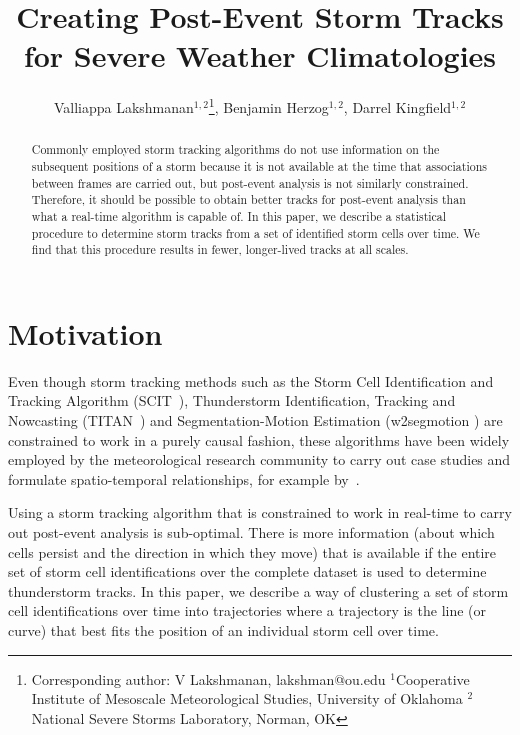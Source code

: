 \documentclass[11pt,twocolumn,twoside]{IEEEtran}
\begin{document}
\title{\vspace{0.2in}\sc Creating Post-Event Storm Tracks for Severe Weather Climatologies}
\author{Valliappa Lakshmanan$^{1,2}$\thanks{Corresponding author: V Lakshmanan, lakshman@ou.edu $^1$Cooperative Institute of Mesoscale Meteorological Studies, University of Oklahoma $^2$National Severe Storms Laboratory, Norman, OK}, Benjamin Herzog$^{1,2}$, Darrel Kingfield$^{1,2}$}

\maketitle
\thispagestyle{fancy}
\begin{abstract}
Commonly employed storm tracking algorithms do not use information on the
subsequent positions of a storm because it is not available at
the time that associations between frames are carried out,
but post-event analysis is
not similarly constrained. Therefore, it should be possible to
obtain better tracks for post-event analysis than what a real-time
algorithm is capable of. In this paper, we describe a statistical
procedure to determine storm tracks from a set of identified storm cells
over time. We find that this procedure results in fewer, longer-lived tracks
at all scales.
\end{abstract}

\section{Motivation}
Even though storm tracking methods such as the Storm Cell Identification
and Tracking Algorithm (SCIT~\cite{scit}), Thunderstorm Identification,
Tracking and Nowcasting (TITAN~\cite{titan}) and Segmentation-Motion
Estimation (w2segmotion \cite{atmosresearch,stormattr}) are constrained
to work in a purely causal fashion, these algorithms have been widely
employed by the meteorological research community to carry out case
studies and formulate spatio-temporal relationships, for example by~\cite{scituse1,scituse3,segmotionuse1,titanuse1}.

Using a storm tracking algorithm that is constrained to work in real-time
to carry out post-event analysis is sub-optimal. There is more information
(about which cells persist and the direction in which they move)
that is available if the entire set of storm
cell identifications over the complete dataset is used to determine
thunderstorm tracks. In this paper, we describe a way of clustering
a set of storm cell identifications over time into trajectories where
a trajectory is the line (or curve) that best fits the
position of an individual storm cell over time.
\end{document}
